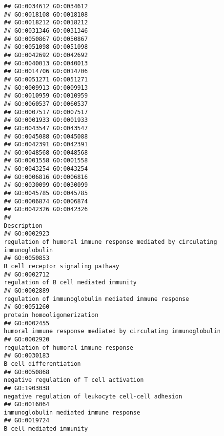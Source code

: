 \documentclass[
]{article}
\begin{document}
\begin{verbatim}
## GO:0034612 GO:0034612
## GO:0018108 GO:0018108
## GO:0018212 GO:0018212
## GO:0031346 GO:0031346
## GO:0050867 GO:0050867
## GO:0051098 GO:0051098
## GO:0042692 GO:0042692
## GO:0040013 GO:0040013
## GO:0014706 GO:0014706
## GO:0051271 GO:0051271
## GO:0009913 GO:0009913
## GO:0010959 GO:0010959
## GO:0060537 GO:0060537
## GO:0007517 GO:0007517
## GO:0001933 GO:0001933
## GO:0043547 GO:0043547
## GO:0045088 GO:0045088
## GO:0042391 GO:0042391
## GO:0048568 GO:0048568
## GO:0001558 GO:0001558
## GO:0043254 GO:0043254
## GO:0006816 GO:0006816
## GO:0030099 GO:0030099
## GO:0045785 GO:0045785
## GO:0006874 GO:0006874
## GO:0042326 GO:0042326
##                                                                                                                                                 Description
## GO:0002923                                                                     regulation of humoral immune response mediated by circulating immunoglobulin
## GO:0050853                                                                                                                B cell receptor signaling pathway
## GO:0002712                                                                                                           regulation of B cell mediated immunity
## GO:0002889                                                                                            regulation of immunoglobulin mediated immune response
## GO:0051260                                                                                                                      protein homooligomerization
## GO:0002455                                                                                   humoral immune response mediated by circulating immunoglobulin
## GO:0002920                                                                                                            regulation of humoral immune response
## GO:0030183                                                                                                                           B cell differentiation
## GO:0050868                                                                                                         negative regulation of T cell activation
## GO:1903038                                                                                              negative regulation of leukocyte cell-cell adhesion
## GO:0016064                                                                                                          immunoglobulin mediated immune response
## GO:0019724                                                                                                                         B cell mediated immunity

\end{verbatim}
\end{document}
